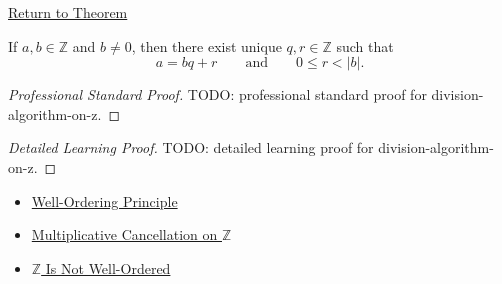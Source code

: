 \newpage
{}
\label{prf:division-algorithm-on-z}

\begin{remark*}[Return]
\hyperref[thm:division-algorithm-on-z]{Return to Theorem}
\end{remark*}

\begin{theorem*}
If $a,b\in\mathbb{Z}$ and $b\ne0$, then there exist unique
$q,r\in\mathbb{Z}$ such that
\[
a=bq+r
\qquad\text{and}\qquad
0\le r<|b|.
\]
\end{theorem*}

\begin{proof}[Professional Standard Proof]
\LRAProofBodyStart
TODO: professional standard proof for division-algorithm-on-z.
\end{proof}

\begin{proof}[Detailed Learning Proof]
\LRAProofBodyStart
TODO: detailed learning proof for division-algorithm-on-z.
\end{proof}

\begin{remark*}
\end{remark*}

\begin{dependencies}
\begin{itemize}
  \item \hyperref[thm:well-ordering-principle]{Well-Ordering Principle}
  \item \hyperref[cor:multiplicative-cancellation-on-z]{Multiplicative Cancellation on $\mathbb{Z}$}
  \item \hyperref[thm:z-is-not-well-ordered]{$\mathbb{Z}$ Is Not Well-Ordered}
\end{itemize}
\end{dependencies}

\clearpage
